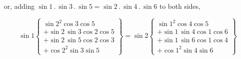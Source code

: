 or, adding $\sin 1 \, . \, \sin 3 \, . \, \sin 5 = \sin 2 \, . \, \sin 4 \, . \, \sin 6$ to both sides,

\[
\sin 1 \left\{\begin{array}{l} \sin 2^2 \cos 3 \cos 5 \\ + \sin 2 \, \sin 3 \cos 2 \cos 5 \\ + \sin 2 \, \sin 5 \cos 2 \cos 3 \\ + \cos 2^2 \sin 3 \sin 5 \end{array}\right\}
= \sin 2 \left\{\begin{array}{l} \sin 1^2 \cos 4 \cos 5 \\ + \sin 1 \, \sin 4 \cos 1 \cos 6 \\ + \sin 1 \, \sin 6 \cos 1 \cos 4 \\ + \cos 1^2 \sin 4 \sin 6 \end{array}\right\}
\]

